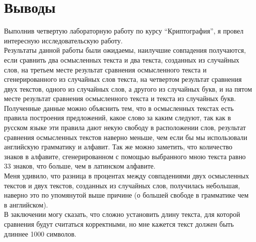 \section{Выводы}
Выполнив четвертую лабораторную работу по курсу \enquote{Криптография}, я провел интересную исследовательскую работу.\\

Результаты данной работы были ожидаемы, наилучшие совпадения получаются, если сравнить два осмысленных текста и два текста, созданных из случайных слов, на третьем месте результат сравнения осмысленного текста и сгенерированного из случайных слов текста, на четвертом результат сравнения двух текстов, одного из случайных слов, а другого из случайных букв, и на пятом месте результат сравнения осмысленного текста и текста из случайных букв. \\

Полученные данные можно объяснить тем, что в осмысленных текстах есть правила построения предложений, какое слово за каким следуют, так как в русском языке эти правила дают некую свободу в расположении слов, результат сравнения осмысленных текстов наверно меньше, чем если бы мы использовали английскую грамматику и алфавит. Так же можно заметить, что количество знаков в алфавите, сгенерированном с помощью выбранного мною текста равно 33 знаков, что больше, чем в латинском алфавите. \\

Меня удивило, что разница в процентах между совпадениями двух осмысленных текстов и двух текстов, созданных из случайных слов, получилась небольшая, наверно это по упомянутой выше причине (о большей свободе в грамматике чем в английском).\\

В заключении могу сказать, что сложно установить длину текста, для которой сравнения будут считаться корректными, но мне кажется текст должен быть длиннее 1000 символов. 

